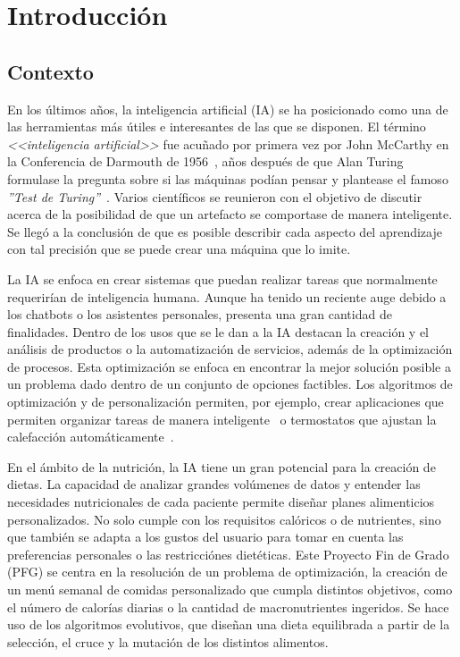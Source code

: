 \chapter{Introducción}
\label{ch:introduccion}

\section{Contexto}
En los últimos años, la inteligencia artificial (IA) se ha posicionado como una de las herramientas más útiles e interesantes de las que se disponen. El término \textit{<<inteligencia artificial>>} fue acuñado por primera vez por John McCarthy en la Conferencia de Darmouth de 1956~\cite{dartmouth1956}, años después de que Alan Turing formulase la pregunta sobre si las máquinas podían pensar y plantease el famoso \textit{''Test de Turing''}~\cite{turing1950}. Varios científicos se reunieron con el objetivo de discutir acerca de la posibilidad de que un artefacto se comportase de manera inteligente. Se llegó a la conclusión de que es posible describir cada aspecto del aprendizaje con tal precisión que se puede crear una máquina que lo imite.

La IA se enfoca en crear sistemas que puedan realizar tareas que normalmente requerirían de inteligencia humana. Aunque ha tenido un reciente auge debido a los chatbots o los asistentes personales, presenta una gran cantidad de finalidades. Dentro de los usos que se le dan a la IA destacan la creación y el análisis de productos o la automatización de servicios, además de la optimización de procesos. Esta optimización se enfoca en encontrar la mejor solución posible a un problema dado dentro de un conjunto de opciones factibles. Los algoritmos de optimización y de personalización permiten, por ejemplo, crear aplicaciones que permiten organizar tareas de manera inteligente~\cite{todoist2024} o termostatos que ajustan la calefacción automáticamente~\cite{googlenest2020}.

En el ámbito de la nutrición, la IA tiene un gran potencial para la creación de dietas. La capacidad de analizar grandes volúmenes de datos y entender las necesidades nutricionales de cada paciente permite diseñar planes alimenticios personalizados. No solo cumple con los requisitos calóricos o de nutrientes, sino que también se adapta a los gustos del usuario para tomar en cuenta las preferencias personales o las restricciónes dietéticas.
\newpage
Este Proyecto Fin de Grado (PFG) se centra en la resolución de un problema de optimización, la creación de un menú semanal de comidas personalizado que cumpla distintos objetivos, como el número de calorías diarias o la cantidad de macronutrientes ingeridos. Se hace uso de los algoritmos evolutivos, que diseñan una dieta equilibrada a partir de la selección, el cruce y la mutación de los distintos alimentos.

